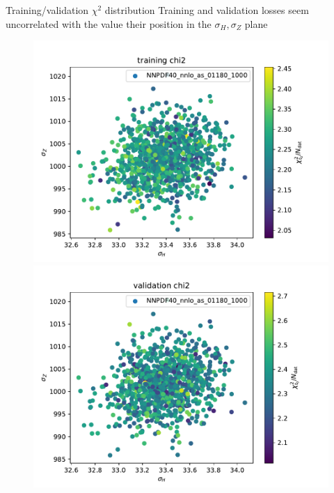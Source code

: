 \documentclass[aspectratio=169,10pt]{beamer}
\begin{document}
\begin{frame}[t]{Training/validation $\chi^2$ distribution}
  Training and validation losses seem uncorrelated with the value their position in the $\sigma_H,\sigma_Z$ plane
  \begin{figure}
    \centering
    \includegraphics[height=.55\textheight]{chi2_training_chi2.pdf}
    \includegraphics[height=.55\textheight]{chi2_validation_chi2.pdf}
  \end{figure}
\end{frame}
\end{document}
